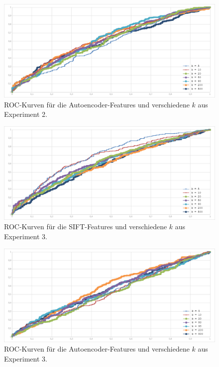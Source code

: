 \begin{figure}[!htb]
	\centering
	\includegraphics[scale=0.56]{images/exp2_roc36.png}
	\caption{ROC-Kurven für die Autoencoder-Features und verschiedene $k$ aus Experiment 2.}
	\label{img:roc4}
\end{figure}

\begin{figure}[!htb]
	\centering
	\includegraphics[scale=0.56]{images/exp3_roc128.png}
	\caption{ROC-Kurven für die SIFT-Features und verschiedene $k$ aus Experiment 3.}
	\label{img:roc5}
\end{figure}

\begin{figure}[!htb]
	\centering
    \includegraphics[scale=0.56]{images/exp3_roc36.png}
    \caption{ROC-Kurven für die Autoencoder-Features und verschiedene $k$ aus Experiment 3.}
    \label{img:roc6}
\end{figure}

